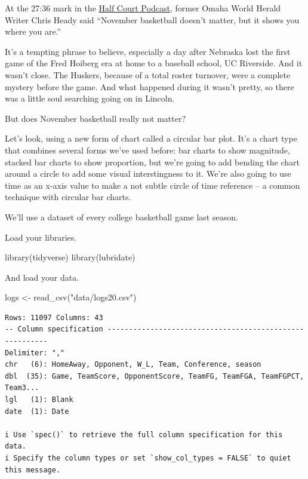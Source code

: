 \documentclass[
  letterpaper,
  DIV=11,
  numbers=noendperiod]{scrreprt}
\newenvironment{Shaded}{\begin{snugshade}}{\end{snugshade}}
\newcommand{\FunctionTok}[1]{\textcolor[rgb]{0.28,0.35,0.67}{#1}}
\newcommand{\NormalTok}[1]{\textcolor[rgb]{0.00,0.23,0.31}{#1}}
\newcommand{\OtherTok}[1]{\textcolor[rgb]{0.00,0.23,0.31}{#1}}
\newcommand{\StringTok}[1]{\textcolor[rgb]{0.13,0.47,0.30}{#1}}
\begin{document}
At the 27:36 mark in the
\href{https://www.omaha.com/sports/podcasts/half-court-press/half-court-press-creighton-cruises-in-opener-nebraska-stunned-in/article_67081a35-3a8f-5e9e-ae67-e88fcacbb362.html}{Half
Court Podcast}, former Omaha World Herald Writer Chris Heady said
``November basketball doesn't matter, but it shows you where you are.''

It's a tempting phrase to believe, especially a day after Nebraska lost
the first game of the Fred Hoiberg era at home to a baseball school, UC
Riverside. And it wasn't close. The Huskers, because of a total roster
turnover, were a complete mystery before the game. And what happened
during it wasn't pretty, so there was a little soul searching going on
in Lincoln.

But does November basketball really not matter?

Let's look, using a new form of chart called a circular bar plot. It's a
chart type that combines several forms we've used before: bar charts to
show magnitude, stacked bar charts to show proportion, but we're going
to add bending the chart around a circle to add some visual
interstingness to it. We're also going to use time as an x-axis value to
make a not subtle circle of time reference -- a common technique with
circular bar charts.

We'll use a dataset of every college basketball game last season.

Load your libraries.

\begin{Shaded}
\begin{Highlighting}[]
\FunctionTok{library}\NormalTok{(tidyverse)}
\FunctionTok{library}\NormalTok{(lubridate)}
\end{Highlighting}
\end{Shaded}

And load your data.

\begin{Shaded}
\begin{Highlighting}[]
\NormalTok{logs }\OtherTok{\textless{}{-}} \FunctionTok{read\_csv}\NormalTok{(}\StringTok{"data/logs20.csv"}\NormalTok{)}
\end{Highlighting}
\end{Shaded}

\begin{verbatim}
Rows: 11097 Columns: 43
-- Column specification --------------------------------------------------------
Delimiter: ","
chr   (6): HomeAway, Opponent, W_L, Team, Conference, season
dbl  (35): Game, TeamScore, OpponentScore, TeamFG, TeamFGA, TeamFGPCT, Team3...
lgl   (1): Blank
date  (1): Date

i Use `spec()` to retrieve the full column specification for this data.
i Specify the column types or set `show_col_types = FALSE` to quiet this message.
\end{verbatim}
\end{document}
